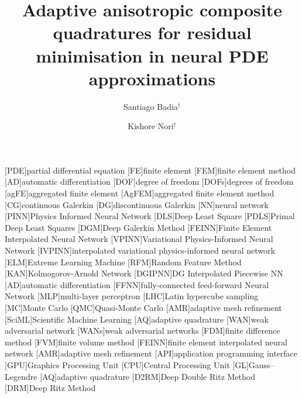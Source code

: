 \documentclass[oneside,reqno,11pt,a4paper]{amsart}
\theoremstyle{definition}
\begin{document}
 
[PDE]{partial differential equation}
[FE]{finite element}
[FEM]{finite element method}
[AD]{automatic differentiation}
[DOF]{degree of freedom}
[DOFs]{degrees of freedom}
[agFE]{aggregated finite element}
[AgFEM]{aggregated finite element method}
[CG]{continuous Galerkin}
[DG]{discontinuous Galerkin}
[NN]{neural network}
[PINN]{Physics Informed Neural Network}
[DLS]{Deep Least Square}
[PDLS]{Primal Deep Least Squares}
[DGM]{Deep Galerkin Method}
[FEINN]{Finite Element Interpolated Neural Network}
[VPINN]{Variational Physics-Informed Neural Network}
[IVPINN]{interpolated variational physics-informed neural network}
[ELM]{Extreme Learning Machine}
[RFM]{Random Feature Method}
[KAN]{Kolmogorov-Arnold Network}
[DGIPNN]{DG Interpolated Piecewise NN}
[AD]{automatic differentiation}
[FFNN]{fully-connected feed-forward Neural Network}
[MLP]{multi-layer perceptron}
[LHC]{Latin hypercube sampling}
[MC]{Monte Carlo}
[QMC]{Quasi-Monte Carlo}
[AMR]{adaptive mesh refinement}
[SciML]{Scientific Machine Learning}
[AQ]{adaptive quadrature}
[WAN]{weak adversarial network}
[WANs]{weak adversarial networks}
[FDM]{finite difference method}
[FVM]{finite volume method}
[FEINN]{finite element interpolated neural network}
[AMR]{adaptive mesh refinement}
[API]{application programming interface}
[GPU]{Graphics Processing Unit}
[CPU]{Central Processing Unit}
[GL]{Gauss--Legendre}
[AQ]{adaptive quadrature}
[D2RM]{Deep Double Ritz Method}
[DRM]{Deep Ritz Method}

\title[Adaptive anisotropic composite quadratures for residual minimisation]{Adaptive anisotropic composite quadratures for residual minimisation in neural PDE approximations}
\author[S. Badia]{Santiago Badia$^{\dagger}$}
\address{$^\dagger$School of Mathematics\\Monash University\\Clayton\\Victoria 3800\\Australia}
\author[K. Nori]{Kishore Nori$^{\dagger}$}
 
\end{document}
